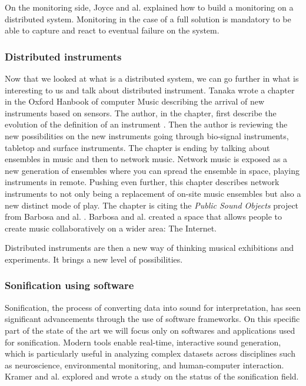 On the monitoring side, Joyce and al. \cite{joyceMonitoringDistributedSystems} explained how to build a monitoring
on a distributed system. Monitoring in the case of a full solution is mandatory to be able to capture and react to eventual
failure on the system.


\subsubsection{Distributed instruments}

Now that we looked at what is a distributed system, we can go further in what is interesting to us and talk about distributed instrument. Tanaka wrote a chapter in the Oxford Hanbook of computer Music \cite{deanOxfordHandbookComputer2009} describing the arrival of new instruments based on sensors.
The author, in the chapter, first describe the evolution of the definition of an instrument \cite{tanaka2009sensor}.
Then the author is reviewing the new possibilities on the new instruments going through bio-signal instruments, tabletop
and surface instruments. The chapter is ending by talking about ensembles in music and then to network music.
Network music is exposed as a new generation of ensembles where you can spread the ensemble in space, playing
instruments in remote. Pushing even further, this chapter describes network instruments to not only being a replacement
of on-site music ensembles but also a new distinct mode of play.
The chapter is citing the \textit{Public Sound Objects} project from Barbosa and al. \cite{barbosaPublicSoundObjects2002}.
Barbosa and al. created a space that allows people to create music collaboratively on a wider area: The Internet.



Distributed instruments are then a new way of thinking musical exhibitions and experiments. It brings a new level of possibilities.





\subsubsection{Sonification using software}

Sonification, the process of converting data into sound for interpretation, has seen significant advancements through the use of software frameworks. On this specific part of the state of the art we will focus only on softwares and applications used for sonification. Modern tools enable real-time, interactive sound generation, which is particularly useful in analyzing complex datasets across disciplines such as neuroscience, environmental monitoring, and human-computer interaction. Kramer and al. \cite{kramerSonificationReportStatusb} explored and wrote a study on the status of the sonification field.

